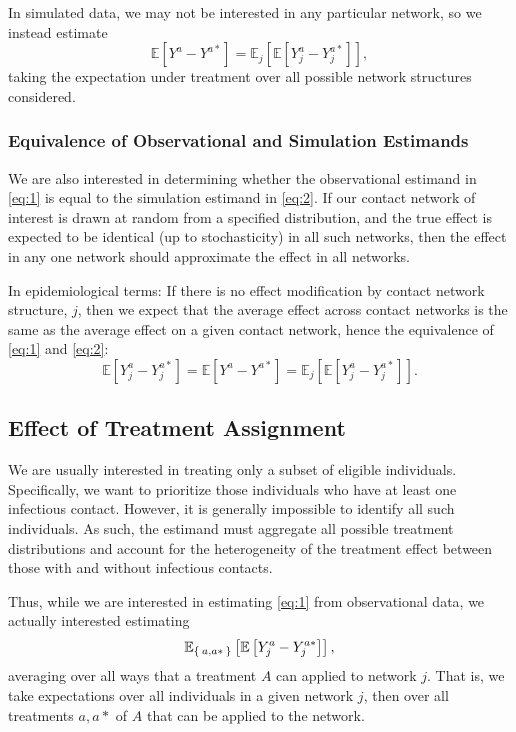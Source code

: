 \documentclass{article}
\theoremstyle{definition}
\begin{document}
In simulated data, we may not be interested in any particular network, so we instead estimate
\begin{equation}\label{eq:2}
    \mathbb{E}\left[Y^{a}-Y^{a*}\right]=\mathbb{E}_{j}\left[\mathbb{E}\left[Y_{j}^{a}-Y_{j}^{a*}\right]\right],
\end{equation}
taking the expectation under treatment over all possible network structures considered. 
\subsubsection{Equivalence of Observational and Simulation Estimands}
We are also interested in determining whether the observational estimand in \ref{eq:1} is equal to the simulation estimand in \ref{eq:2}. If our contact network of interest is drawn at random from a specified distribution, and the true effect is expected to be identical (up to stochasticity) in all such networks, then the effect in any one network should approximate the effect in all networks.

In epidemiological terms: If there is no effect modification by contact network structure, $j$, then we expect that the average effect across contact networks is the same as the average effect on a given contact network, hence the equivalence of \ref{eq:1} and \ref{eq:2}:
\begin{equation}\label{eq:7}
      \mathbb{E}\left[Y_{j}^{a}-Y_{j}^{a*}\right]=\mathbb{E}\left[Y^{a}-Y^{a*}\right]=\mathbb{E}_{j}\left[\mathbb{E}\left[Y_{j}^{a}-Y_{j}^{a*}\right]\right].
\end{equation}
\subsection{Effect of Treatment Assignment}
We are usually interested in treating only a subset of eligible individuals. Specifically, we want to prioritize those individuals who have at least one infectious contact. However, it is generally impossible to identify all such individuals. As such, the estimand must aggregate all possible treatment distributions and account for the heterogeneity of the treatment effect between those with and without infectious contacts.

Thus, while we are interested in estimating \ref{eq:1} from observational data, we actually interested estimating 
\begin{equation}\label{eq:3}
    \mathbb{E}_{\Set{a,a*   }}\left[\mathbb{E}\left[Y_{j}^{a}-Y_{j}^{a*}\right]\right],
\end{equation}
averaging over all ways that a treatment $A$ can applied to network $j$. That is, we take expectations over all individuals in a given network $j$, then over all treatments $a,a*$ of $A$ that can be applied to the network.
\end{document}
